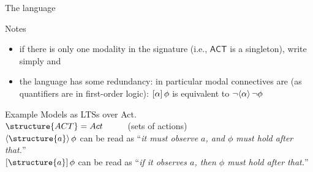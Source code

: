 \documentclass[aspectratio=169]{beamer}
\begin{document}
\begin{slide}{The language}\label{s:11}
\small
\begin{block}{Notes}
\begin{itemize}
\item if there is only one modality in the signature (i.e., $\mathsf{ACT}$ is a singleton), write simply \structure{$\eventual \phi$} and \structure{$\always \phi$}
\item the language has some redundancy: in particular modal connectives are  (as quantifiers are in first-order logic):
$[\alpha]\,{\phi}$ is equivalent to  $\neg \langle \alpha \rangle\,{\neg \phi}$
\end{itemize}
\end{block}


\begin{exampleblock}{Example}
  Models as LTSs over Act.\\
  $\structure{ACT} = {Act}$ ~~~~~(sets of actions)\\
  $\evm{\structure{a}} \phi$ can be read as ``\emph{it \alert{must} observe $a$, and $\phi$ must hold after that.}''\\
  $\alm{\structure{a}} \phi$ can be read as ``\emph{\alert{if} it observes $a$, then $\phi$ must hold after that.}''
\end{exampleblock}

\end{slide}

\end{document}
